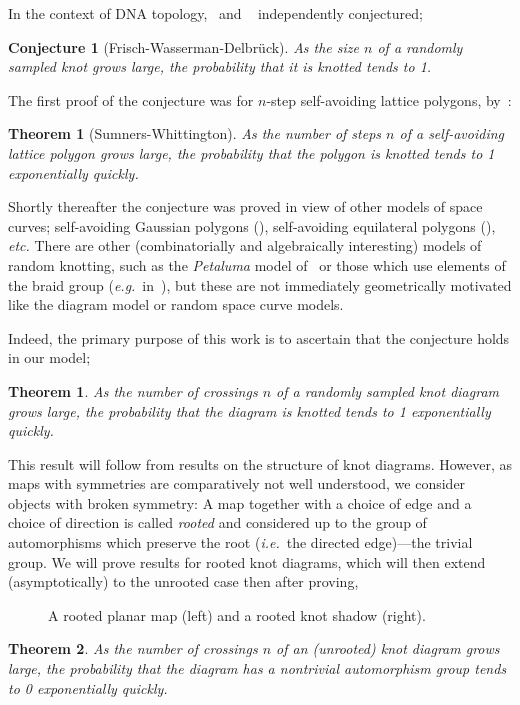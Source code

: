 \documentclass[submission%
]{dmtcs}
\newtheorem*{conjecture}{Conjecture}
\newtheorem{theorem}{Theorem}
\newtheorem*{untheorem}{Theorem}
\begin{document}
In the context of DNA topology,~\cite{Frisch_1961} and
~\cite{delbruck1962ams} independently conjectured;
\begin{conjecture}[Frisch-Wasserman-Delbr\"uck]
  As the size $n$ of a randomly sampled knot grows large, the
  probability that it is knotted tends to 1.
\end{conjecture}
The first proof of the conjecture was for $n$-step self-avoiding
lattice polygons, by~\cite{Sumners_1988}:
\begin{untheorem}[Sumners-Whittington]
  As the number of steps $n$ of a self-avoiding lattice polygon grows
  large, the probability that the polygon is knotted tends to 1
  exponentially quickly.
\end{untheorem}
Shortly thereafter the conjecture was proved in view of other models
of space curves; self-avoiding Gaussian polygons
(\cite{douglas94gauss}), self-avoiding equilateral polygons
(\cite{diao95eqpoly}), \textit{etc.} There are other (combinatorially
and algebraically interesting) models of random knotting, such as the
\emph{Petaluma} model of~\cite{petaluma1} or those which use elements
of the braid group (\textit{e.g.}\ in~\cite{Nechaev:1996gv}), but these are not
immediately geometrically motivated like the diagram model or random
space curve models.

Indeed, the primary purpose of this work is to ascertain that the
conjecture holds in our model;
\begin{theorem}
  \label{thm:knotted}
  As the number of crossings $n$ of a randomly sampled knot diagram
  grows large, the probability that the diagram is knotted tends to 1
  exponentially quickly.
\end{theorem}
This result will follow from results on the structure of knot
diagrams. However, as maps with symmetries are comparatively not well
understood, we consider objects with broken symmetry: A map together
with a choice of edge and a choice of direction is called
\emph{rooted} and considered up to the group of automorphisms which
preserve the root (\textit{i.e.}\ the directed edge)---the trivial
group. We will prove results for rooted knot diagrams, which will then
extend (asymptotically) to the unrooted case then after proving,
\begin{figure}[htbp]
  \centering
  
  \caption{A rooted planar map (left) and a rooted knot shadow (right).}
  \label{fig:planar-map-eg}
\end{figure}

\begin{theorem}
  \label{thm:asymm}
  As the number of crossings $n$ of an (unrooted) knot diagram grows
  large, the probability that the diagram has a nontrivial
  automorphism group tends to 0 exponentially quickly.
\end{theorem}
\end{document}
